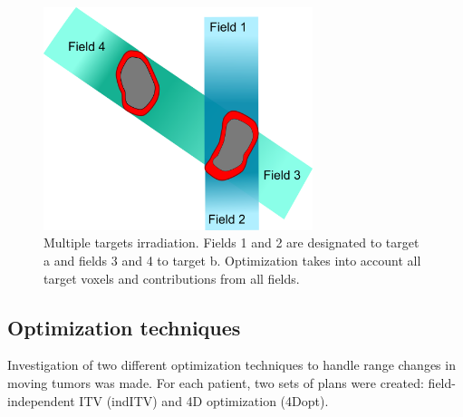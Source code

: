\documentclass[type=dr, dr=rernat, accentcolor=tud7b,colorbacktitle, bigchapter, openright, twoside, 12pt ]{tudthesis}
\begin{document}
\newpage


\begin{figure}[H]
	\begin{center}
		\includegraphics[width=0.7\textwidth]{./Images/multiTarget.png}
		\caption{Multiple targets irradiation. Fields 1 and 2 are designated to target a and fields 3 and 4 to target b. Optimization takes into account all target voxels and contributions from all fields.}
		\label{Fig:multiTargets}
	\end{center}
\end{figure}



\subsection{Optimization techniques}

Investigation of two different optimization techniques to handle range changes in moving tumors was made. For each patient, two sets of plans were created: field-independent ITV (indITV) and 4D optimization (4Dopt). 
\end{document}
